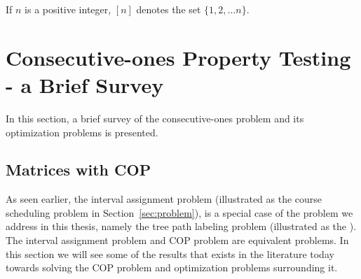\begin{definition}
  \label{def:maxclique}    
\end{definition}

If $n$ is a positive integer, $[n]$ denotes the set $\{1,2,... n\}$.

\section{Consecutive-ones Property Testing - a Brief Survey}
\label{sec:background}

In this section, a brief survey of the consecutive-ones problem and
its optimization problems is presented.


\subsection{Matrices with COP}
\label{sec:copmatrices}
As seen earlier, the interval assignment problem (illustrated as the
course scheduling problem in Section~\ref{sec:problem}), is a special
case of the problem we address in this thesis, namely the tree path
labeling problem (illustrated as the \illustrationproblem). The
interval assignment problem and COP problem are equivalent
problems. In this section we will see some of the results that exists
in the literature today towards solving the COP problem and
optimization problems surrounding it.



